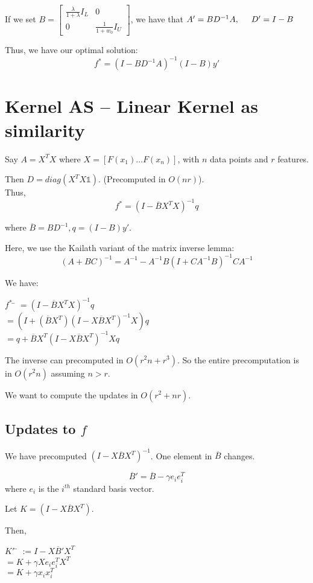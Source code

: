 \documentclass[12pt]{article}
\newcommand{\inv}[1]{#1^{-1}}
\begin{document}
If we set $B = \left[\begin{matrix} \frac{\lambda}{1+\lambda}I_L & 0 \\ 0 & \frac{1}{1+w_0}I_U \end{matrix}\right]$, we have that $A' = B\inv D A, \hspace{5mm} D' = I-B$

Thus, we have our optimal solution: $$f^* = \inv{(I - B\inv D A)}(I-B)y'$$

\section{Kernel AS -- Linear Kernel as similarity}

Say $A = X^T X$ where $X = [F(x_1) \hdots F(x_n)]$, with $n$ data points and $r$ features.

Then $D = diag (X^T X \mathbb{1})$. (Precomputed in $O(nr)$).\\

Thus, $$f^* = \inv{(I - \overline{B} X^TX)}q$$

where $\overline{B} = B \inv{D}, q = (I-B)y'$.

Here, we use the Kailath variant of the matrix inverse lemma:
$$\inv{(A+BC)} = \inv{A} -  \inv{A}B\inv{(I+C\inv{A}B)}C\inv{A}$$

We have: 
\begin{tabbing}
$f^* $ \= $= \inv{(I - \overline{B} X^TX)}q$\\
\> $=(I+(\overline{B}X^T)\inv{(I-X\overline{B}X^T)}X)q$\\
\>$=q + \overline{B}X^T\inv{(I-X\overline{B}X^T)}Xq$
\end{tabbing}

The inverse can precomputed in $O(r^2n + r^3)$. 
So the entire precomputation is in $O(r^2n)$ assuming $n > r$.

We want to compute the updates in $O(r^2 + nr)$.

\subsection{Updates to $f$}

We have precomputed $\inv{(I-X\overline{B}X^T)}$. One element in $\overline{B}$ changes.

$$\overline{B}' = \overline{B} -\gamma e_i e_i^T$$
where $e_i$ is the $i^{th}$ standard basis vector.

Let $K = (I-X\overline{B}X^T)$.

Then,
\begin{tabbing} 
$K'$ \= $:=I - X\overline{B}'X^T$\\
\>$= K + \gamma X e_i e_i^T X^T$\\
\>$= K + \gamma x_i x_i^T$
\end{tabbing}
\end{document}
